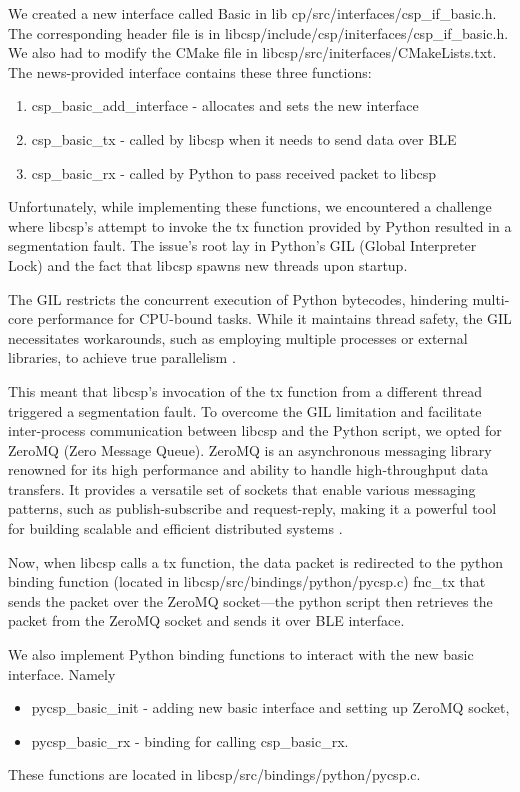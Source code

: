 \documentclass[conference]{IEEEtran}
\begin{document}
We created a new interface called Basic in lib cp/src/interfaces/csp\_if\_basic.h. The corresponding header file is in libcsp/include/csp/initerfaces/csp\_if\_basic.h. We also had to modify the CMake file in libcsp/src/initerfaces/CMakeLists.txt.
The news-provided interface contains these three functions:
\begin{enumerate}
    \item csp\_basic\_add\_interface - allocates and sets the new interface
    \item csp\_basic\_tx - called by libcsp when it needs to send data over BLE
    \item csp\_basic\_rx - called by Python to pass received packet to libcsp
\end{enumerate}

Unfortunately, while implementing these functions, we encountered a challenge where libcsp's attempt to invoke the tx function provided by Python resulted in a segmentation fault. The issue's root lay in Python's GIL (Global Interpreter Lock) and the fact that libcsp spawns new threads upon startup.

The GIL restricts the concurrent execution of Python bytecodes, hindering multi-core performance for CPU-bound tasks. While it maintains thread safety, the GIL necessitates workarounds, such as employing multiple processes or external libraries, to achieve true parallelism \cite{gil}.

This meant that libcsp's invocation of the tx function from a different thread triggered a segmentation fault. To overcome the GIL limitation and facilitate inter-process communication between libcsp and the Python script, we opted for ZeroMQ (Zero Message Queue). ZeroMQ is an asynchronous messaging library renowned for its high performance and ability to handle high-throughput data transfers. It provides a versatile set of sockets that enable various messaging patterns, such as publish-subscribe and request-reply, making it a powerful tool for building scalable and efficient distributed systems \cite{zmq}.

Now, when libcsp calls a tx function, the data packet is redirected to the python binding function (located in libcsp/src/bindings/python/pycsp.c) fnc\_tx that sends the packet over the ZeroMQ socket—the python script then retrieves the packet from the ZeroMQ socket and sends it over BLE interface.

We also implement Python binding functions to interact with the new basic interface. Namely
\begin{itemize}
    \item pycsp\_basic\_init - adding new basic interface and setting up ZeroMQ socket,
    \item pycsp\_basic\_rx - binding for calling csp\_basic\_rx.
\end{itemize}
These functions are located in libcsp/src/bindings/python/pycsp.c.
\end{document}
